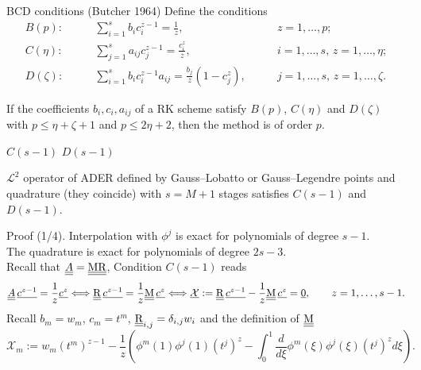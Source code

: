 \documentclass[9pt,compress,t,aspectratio=169]{beamer}
\begin{document}
\begin{frame}{BCD conditions (Butcher 1964)}
	Define the conditions
\begin{align}
	B(p):\qquad  & \sum_{i=1}^s b_i c_i^{z-1}=\frac1z,\qquad & z=1,\dots,p;\\
	C(\eta):\qquad  & \sum_{j=1}^s a_{ij} c_j^{z-1}=\frac{c_i^z}{z},\qquad & 
	i=1,\dots,s,\,z=1,\dots,\eta;\\
	D(\zeta):\qquad  & \sum_{i=1}^s b_i c_i^{z-1}a_{ij}=\frac{b_j}{z}(1-c_j^z),
	\qquad &j=1,\dots,s,\, z=1,\dots,\zeta. 
\end{align}
\begin{theorem}[Butcher 1964]
	If the coefficients $b_i,c_i,a_{ij}$ of a RK scheme satisfy $B(p)$,
    $C(\eta)$ and $D(\zeta)$ with $p\leq \eta +\zeta +1$ and $p\leq 2\eta +2$, 
	then the method is of order $p$.
\end{theorem}
\end{frame}

\begin{frame}{$C(s-1)$ $D(s-1)$}
	\begin{lemma}
		$\mathcal{L}^2$ operator of ADER defined by Gauss--Lobatto or Gauss--Legendre points and quadrature (they coincide) with $s=M+1$ stages satisfies
		 $C(s-1)$ and $D(s-1)$.
	\end{lemma}
	\begin{block}{Proof (1/4).}
		Interpolation with $\phi^j$ is exact for polynomials
		 of degree $s-1$.\\
		The quadrature is exact for polynomials of degree $2s-3$.\\
		Recall that $\underline{\underline{A}} = \underline{\underline{\mathrm{M}}} \underline{\underline{\mathrm{R}}}$, Condition $C(s-1)$  reads  \vspace*{-2mm}
		\begin{equation*}
			\underline{\underline{A}}\, \underline{c^{z-1}}  = \frac{1}{z}\underline{c^z} 
			\Longleftrightarrow \RHS \, 
			\underline{c^{z-1}}= \frac{1}{z} \M\,\underline{c^z}
			\Longleftrightarrow \underline{\mathcal{X}}:=\RHS \, 
			\underline{c^{z-1}}- \frac{1}{z} \M\,\underline{c^z}=\underline{0}, 
			\qquad z=1,\dots, s-1.\vspace*{-2mm}
		\end{equation*}
		Recall $b_m=w_m$, $c_m=t^m$, $\underline{\underline{\mathrm{R}}}_{i,j}=\delta_{i,j}w_i$ and the definition of $\underline{\underline{\mathrm{M}}}$\vspace*{-2mm}
		\begin{equation*}
			\mathcal{X}_m:=w_m (t^{m})^{z-1} - \frac{1}{z} \left( \phi^m (1) \phi^j (1) (t^j)^z -
			 \int_0^1 \frac{d}{d\xi}\phi^m(\xi) \phi^j(\xi)(t^j)^z  d\xi  \right).
		\end{equation*}
	\end{block}
\end{frame}
\end{document}
